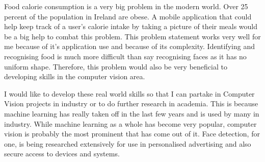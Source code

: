 Food calorie consumption is a very big problem in the modern world.
Over 25 percent of the population in Ireland are obese.
A mobile application that could help keep track of a user's calorie intake by taking a picture of their meals would be a big help to combat this problem.
This problem statement works very well for me because of it's application use and because of its complexity.
Identifying and recognising food is much more difficult than say recognising faces as it has no uniform shape.
Therefore, this problem would also be very beneficial to developing skills in the computer vision area.

I would like to develop these real world skills so that I can partake in
Computer Vision projects in industry or to do further research in academia. This
is because machine learning has really taken off in the last few years and is
used by many in industry. While machine learning as a whole has become very
popular, computer vision is probably the most prominent that has come out of it.
Face detection, for one, is being researched extensively for use in personalised
advertising and also secure access to devices and systems.
